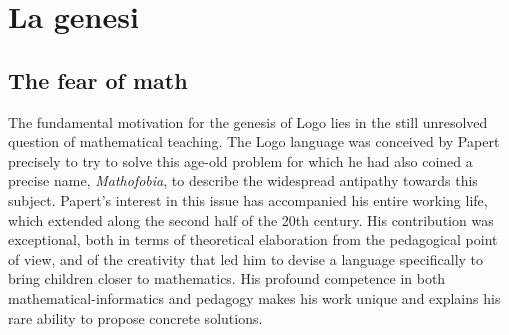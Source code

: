 \chapter{La genesi} \label{cap:papert}

\section{The fear of math}

The fundamental motivation for the genesis of Logo lies in the still unresolved question of mathematical teaching. The Logo language was conceived by Papert precisely to try to solve this age-old problem for which he had also coined a precise name, \textit{Mathofobia}, to describe the widespread antipathy towards this subject. Papert's interest in this issue has accompanied his entire working life, which  extended along the second half of the 20th century. His contribution was exceptional, both in terms of theoretical elaboration from the pedagogical point of view, and of the creativity that led him to devise a language specifically to bring children closer to mathematics. His profound competence in both mathematical-informatics and pedagogy makes his work unique and explains his rare ability to propose concrete solutions.

